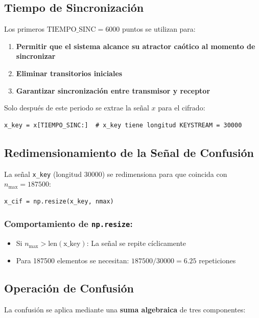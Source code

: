 \documentclass[12pt,a4paper]{article}
\begin{document}
	\subsection{Tiempo de Sincronización}
	
	Los primeros $\text{TIEMPO\_SINC} = 6000$ puntos se utilizan para:
	\begin{enumerate}
		\item \textbf{Permitir que el sistema alcance su atractor caótico al momento de sincronizar}
		\item \textbf{Eliminar transitorios iniciales}
		\item \textbf{Garantizar sincronización entre transmisor y receptor}
	\end{enumerate}
	
	Solo después de este periodo se extrae la señal $x$ para el cifrado:
	\begin{lstlisting}
x_key = x[TIEMPO_SINC:]  # x_key tiene longitud KEYSTREAM = 30000
	\end{lstlisting}
	
	\subsection{Redimensionamiento de la Señal de Confusión}
	
	La señal \texttt{x\_key} (longitud 30000) se redimensiona para que coincida con $n_{\text{max}} = 187500$:
	
	\begin{lstlisting}
x_cif = np.resize(x_key, nmax)
	\end{lstlisting}
	
	\subsubsection*{Comportamiento de \texttt{np.resize}:}
	\begin{itemize}
		\item Si $n_{\text{max}} > \text{len}(\text{x\_key})$: La señal se repite cíclicamente
		\item Para 187500 elementos se necesitan: $187500 / 30000 = 6.25$ repeticiones
	\end{itemize}
	
	\subsection{Operación de Confusión}
	
	La confusión se aplica mediante una \textbf{suma algebraica} de tres componentes:
	
\end{document}

